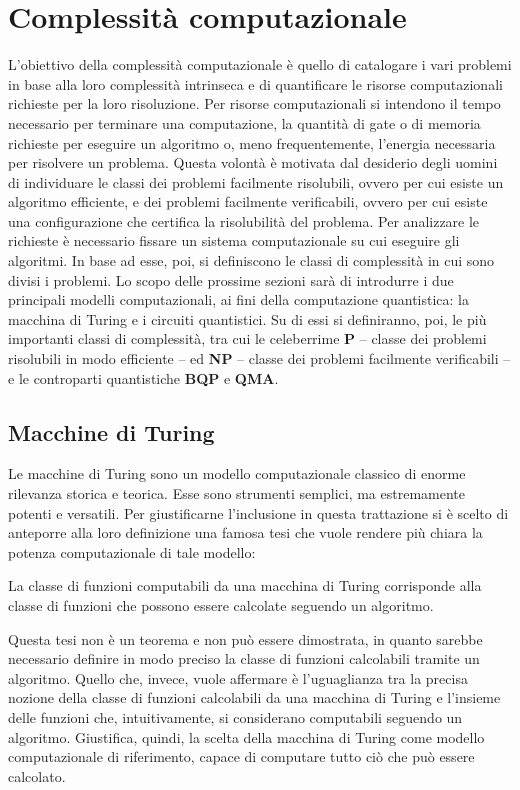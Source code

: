 \chapter{Complessità computazionale}\label{chap:CC}
L'obiettivo della complessità computazionale è quello di catalogare i vari problemi in base alla loro complessità intrinseca e di quantificare le risorse computazionali richieste per la loro risoluzione.
Per risorse computazionali si intendono il tempo necessario per terminare una computazione, la quantità di gate o di memoria richieste per eseguire un algoritmo o, meno frequentemente, l'energia necessaria per risolvere un problema.
Questa volontà è motivata dal desiderio degli uomini di individuare le classi dei problemi facilmente risolubili, ovvero per cui esiste un algoritmo efficiente, e dei problemi facilmente verificabili, ovvero per cui esiste una configurazione che certifica la risolubilità del problema.
Per analizzare le richieste è necessario fissare un sistema computazionale su cui eseguire gli algoritmi.
In base ad esse, poi, si definiscono le classi di complessità in cui sono divisi i problemi.
Lo scopo delle prossime sezioni sarà di introdurre i due principali modelli computazionali, ai fini della computazione quantistica: la macchina di Turing e i circuiti quantistici.
Su di essi si definiranno, poi, le più importanti classi di complessità, tra cui le celeberrime \textbf{P} -- classe dei problemi risolubili in modo efficiente -- ed \textbf{NP} -- classe dei problemi facilmente verificabili -- e le controparti quantistiche \textbf{BQP} e \textbf{QMA}.

\section{Macchine di Turing}
Le macchine di Turing sono un modello computazionale classico di enorme rilevanza storica e teorica.
Esse sono strumenti semplici, ma estremamente potenti e versatili.
Per giustificarne l'inclusione in questa trattazione si è scelto di anteporre alla loro definizione una famosa tesi che vuole rendere più chiara la potenza computazionale di tale modello:

\begin{description}[align=left]
  \item [Tesi di Church-Turing:] La classe di funzioni computabili da una macchina di Turing corrisponde alla classe di funzioni che possono essere calcolate seguendo un algoritmo.
\end{description}
\noindent
Questa tesi non è un teorema e non può essere dimostrata, in quanto sarebbe necessario definire in modo preciso la classe di funzioni calcolabili tramite un algoritmo.
Quello che, invece, vuole affermare è l'uguaglianza tra la precisa nozione della classe di funzioni calcolabili da una macchina di Turing e l'insieme delle funzioni che, intuitivamente, si considerano computabili seguendo un algoritmo.
Giustifica, quindi, la scelta della macchina di Turing come modello computazionale di riferimento, capace di computare tutto ciò che può essere calcolato.
